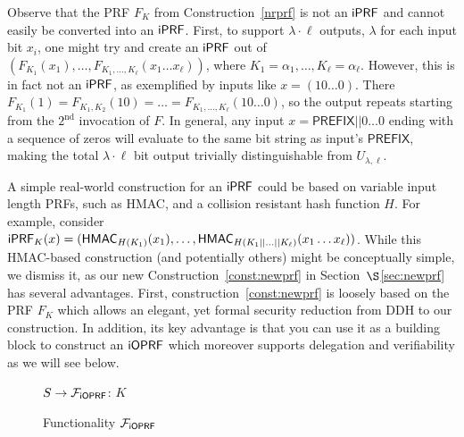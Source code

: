 Observe that the \citeauthor{prf} PRF $F_K$ from
Construction~\ref{nrprf} is not an $\mathsf{i}\mathsf{PRF}$ and cannot easily be
converted into an $\mathsf{i}\mathsf{PRF}$. First, to support $\lambda\cdot\ell$
outputs, $\lambda$ for each input bit $x_i$, one might try and create
an $\mathsf{i}\mathsf{PRF}$ out of
$(F_{K_1}(x_1),\ldots,F_{K_1,\ldots,K_\ell}(x_1\ldots{}x_\ell))$,
where $K_1=\alpha_1,\ldots,K_\ell=\alpha_\ell$.  However, this is in
fact not an $\mathsf{i}\mathsf{PRF}$, as exemplified by inputs like
$x=(10\ldots{}0)$. There
$F_{K_1}(1)=F_{K_1,K_2}(10)=\ldots=F_{K_1,\ldots,K_\ell}(10\ldots{}0)$,
so the output repeats starting from the $2^\text{nd}$ invocation of
$F$. In general, any input $x=\mathsf{PREFIX}||0\ldots{}0$ ending with
a sequence of zeros will evaluate to the same bit string as input's
$\mathsf{PREFIX}$, making the total $\lambda\cdot\ell$ bit output
trivially distinguishable from $U_{\lambda,\ell}$.

A simple real-world construction for an $\mathsf{i}\mathsf{PRF}$ could be based on
variable input length PRFs, such as HMAC, and a collision resistant
hash function $H$. For example, consider
$\mathsf{i}\mathsf{PRF}_K(x)=(\mathsf{HMAC}_{H(K_1)}(x_1),\ldots,\mathsf{HMAC}_{H(K_1||\ldots||K_\ell)}(x_1\ldots{}x_\ell))$.
While this HMAC-based construction (and potentially others) might be
conceptually simple, we dismiss it, as our new
Construction~\ref{const:newprf} in Section~$\S$\ref{sec:newprf} has
several advantages.  First, construction~\ref{const:newprf} is loosely
based on the \citeauthor{prf} PRF $F_K$ which allows an elegant, yet
formal security reduction from DDH to our construction. In addition,
its key advantage is that you can use it as a building block to
construct an $\mathsf{i}\mathsf{OPRF}$ which moreover supports delegation and
verifiability as we will see below.


\begin{figure}[tb]
\LinesNumbered
\begin{functionality}[H]
  $S\rightarrow{}\mathcal{F}_{\mathsf{i}\mathsf{OPRF}}$: $K$\; 
\end{functionality}
\caption{Functionality $\mathcal{F}_{\mathsf{i}\mathsf{OPRF}}$\label{idealioprf}}
\end{figure}

